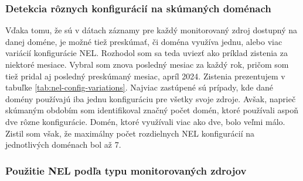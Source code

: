 \subsubsection{Detekcia rôznych konfigurácií na skúmaných doménach}

Vďaka tomu, že sú v dátach záznamy pre každý monitorovaný zdroj dostupný na danej doméne, je možné tiež preskúmať, či doména využíva jednu, alebo viac variácií konfigurácie NEL.
Rozhodol som sa teda uviezť ako príklad zistenia za niektoré mesiace.
Vybral som znova posledný mesiac za každý rok, pričom som tiež pridal aj posledný preskúmaný mesiac, apríl 2024.
Zistenia prezentujem v tabuľke \ref{tab:nel-config-variations}.
Najviac zastúpené sú prípady, kde dané domény používajú iba jednu konfiguráciu pre všetky svoje zdroje.
Avšak, naprieč skúmaným obdobím som identifikoval značný počet domén, ktoré používali aspoň dve rôzne konfigurácie.
Domén, ktoré využívali viac ako dve, bolo veľmi málo.
Zistil som však, že maximálny počet rozdielnych NEL konfigurácií na jednotlivých doménach bol až 7.

\begin{table}[!htb]
\centering
{}
\caption{Počty domén s rôznym počtom rozdielnych NEL konfigurácií pre vybrané dátumy.}
\label{tab:nel-config-variations}
\end{table}

\subsubsection{Použitie NEL podľa typu monitorovaných zdrojov}

